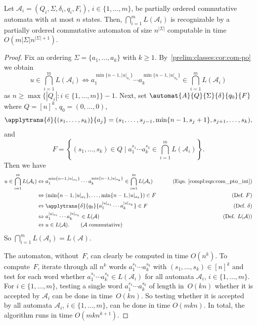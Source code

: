 \begin{proposition}
	\label{compl:prop:intersection_waa_com}
	Let $\mathcal A_i = (Q_i,\Sigma, \delta_i, q_i, F_i)$,
	$i \in \{1,\ldots,m\}$,
	be partially ordered commutative automata
	with at most $n$ states.
	Then, $\bigcap_{i=1}^m L(\mathcal A_i)$
	is recognizable by a partially ordered
	commutative automaton 
	of size $n^{|\Sigma|}$ %
	computable in time $O(m|\Sigma| n^{|\Sigma|+1})$.
\end{proposition} 
\begin{proof} 
	Fix an ordering $\Sigma = \{a_1, \ldots, a_k\}$ with $k \ge 1$.
	By~\cref{prelim:classes:cor:com-po} we obtain
	\begin{equation}\label{compl:eqn:com_pto_int}
		u \in \bigcap_{i=1}^m L(\mathcal A_i)
		\Leftrightarrow a_1^{\min\{n-1, |u|_{a_1}\}} \cdots a_k^{\min\{n-1, |u|_{a_k}\}} \in \bigcap_{i=1}^m L(\mathcal A_i)
	\end{equation}
	as $n \ge \max\{ |Q_i| : i \in \{1,\ldots,m\} \} - 1$. 
	Next, set $\automat{A}{Q}{\Sigma}{\delta}{q_0}{F}$
	where $Q = [n]^k$, $q_0 = (0,\ldots,0)$,
	\[
	\applytrans{\delta}{(s_1, \ldots, s_k)}{a_j} = (s_1, \ldots, s_{j-1}, \min\{n-1, s_j+1\}, s_{j+1}, \ldots, s_k),
	\]
	and 
	\[
	F = \left\{ (s_1, \ldots, s_k) \in Q \mid a_1^{s_1} \cdots a_k^{s_k} \in \bigcap_{i=1}^m L(\mathcal A_i)
	\right\}.
	\]
	Then we have
	\begin{align*}
		u \in \bigcap_{i=1}^m L(\mathcal A_i)
		& \Leftrightarrow  a_1^{\min\{n-1, |u|_{a_1}\}} \cdots a_k^{\min\{n-1, |u|_{a_k}\}} \in \bigcap_{i=1}^m L(\mathcal A_i) 
		& \tag{Eqn.~\eqref{compl:eqn:com_pto_int}}\\
		& \Leftrightarrow (\min\{n-1, |u|_{a_1}\}, \ldots, \min\{n-1, |u|_{a_k}\}) \in F 
		& \tag{Def.~$F$} \\ 
		& \Leftrightarrow \applytrans{\delta}{q_0}{a_1^{|u|_{a_1}} \cdots a_k^{|u|_{a_k}}} \in F 
		& \tag{Def.~$\delta$} \\
		& \Leftrightarrow a_1^{|u|_{a_1}}	\cdots a_k^{|u|_{a_k}} \in L(\mathcal A) 
		& \tag{Def. $L(\mathcal A)$}\\
		& \Leftrightarrow u \in L(\mathcal A). \tag{$\mathcal A$ commutative}					
	\end{align*}
	So $\bigcap_{i=1}^m L(\mathcal A_i) = L(\mathcal A)$.
		
	The automaton, without~$F$, can clearly
	be computed in time $O(n^k)$. To
	compute~$F$, 
	iterate through all $n^k$ words $a_1^{s_1} \cdots a_k^{s_k}$
	with $(s_1, \ldots, s_k) \in [n]^k$
	and test for each word whether
	$a_1^{s_1} \cdots a_k^{s_k} \in L(\mathcal A_i)$
	for all automata $\mathcal A_i$, $i \in \{1,\ldots,m\}$.
	For $i \in \{1,\ldots,m\}$, testing a single word  $a_1^{s_1} \cdots a_k^{s_k}$ of length in~$O(kn)$
	whether it is accepted by $\mathcal A_i$
	can be done in time~$O(kn)$. So testing 
	whether it is accepted by all automata $\mathcal A_i$, $i\in \{1,\ldots,m\}$,
	can be done in time $O(mkn)$. 
	In total, the algorithm runs in time $O(mkn^{k+1})$. 
\end{proof}

